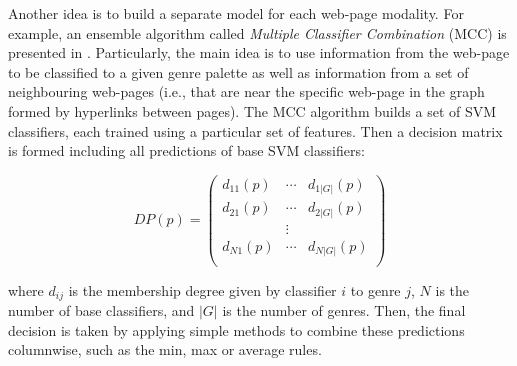 Another idea is to build a separate model for each web-page modality. For example, an ensemble algorithm called \textit{Multiple Classifier Combination} (MCC) is presented in \parencite{zhu2016exploiting}. Particularly, the main idea is to use information from the web-page to be classified to a given genre palette as well as information from a set of neighbouring web-pages (i.e., that are near the specific web-page in the graph formed by hyperlinks between pages). The MCC algorithm builds a set of SVM classifiers, each trained using a particular set of features. Then a decision matrix is formed including all predictions of base SVM classifiers:

\begin{equation}\label{chap:relevant_work:eq:GenreSim_DP}
	DP(p) = \left(
    	\begin{array}{ccc}
        	d_{11} (p) & \cdots & d_{1|G|} (p) \\
            d_{21} (p) & \cdots  & d_{2|G|} (p) \\
            & \vdots & \\
            d_{N1} (p) & \cdots  & d_{N|G|} (p) \\
         \end{array}
\right)
\end{equation}

\noindent
where $d_{ij}$ is the membership degree given by classifier $i$ to genre $j$, $N$ is the number of base classifiers, and $|G|$ is the number of genres. Then, the final decision is taken by applying simple methods to combine these predictions columnwise, such as the min, max or average rules.



